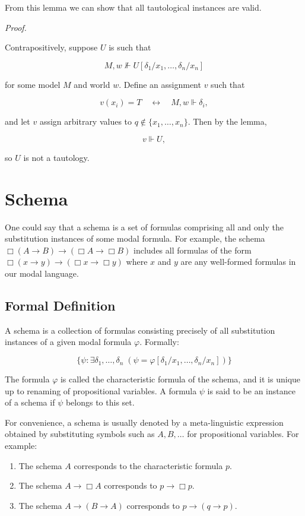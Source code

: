 \documentclass[12pt,a4paper,openany]{article}
\begin{document}
From this lemma we can show that all tautological instances are valid.

\textit{Proof.}

Contrapositively, suppose $U$ is such that

$$M,w \nVdash U[\delta_1/x_1,\ldots, \delta_n/x_n]$$

for some model $M$ and world $w$. Define an assignment $v$ such that

$$v(x_i) = T \quad \leftrightarrow \quad M,w \Vdash \delta_i,$$

and let $v$ assign arbitrary values to $q \notin \{x_1, \ldots, x_n\}$. Then by the lemma,

$$v \Vdash U,$$

so $U$ is not a tautology.

\section{Schema}

One could say that a schema is a set of formulas comprising all and only the substitution instances of some modal formula. For example, the schema $\Box(A \to B) \to (\Box A \to \Box B)$ includes all formulas of the form $\Box(x \to y) \to (\Box x \to \Box y)$ where $x$ and $y$ are any well-formed formulas in our modal language.

\subsection{Formal Definition}

A schema is a collection of formulas consisting precisely of all substitution instances of a given modal formula $\varphi$. Formally:

$$\{ \psi : \exists \delta_1, \ldots, \delta_n\; (\psi = \varphi[\delta_1/x_1, \ldots,\delta_n/x_n]) \}$$

The formula $\varphi$ is called the characteristic formula of the schema, and it is unique up to renaming of propositional variables. A formula $\psi$ is said to be an instance of a schema if $\psi$ belongs to this set.

For convenience, a schema is usually denoted by a meta-linguistic expression obtained by substituting symbols such as $A, B, \dots$ for propositional variables. For example:

\begin{enumerate}
    \item The schema $A$ corresponds to the characteristic formula $p$.
    \item The schema $A \to \Box A$ corresponds to $p \to \Box p$.
    \item The schema $A \to (B \to A)$ corresponds to $p \to (q \to p)$.
\end{enumerate}
\end{document}
